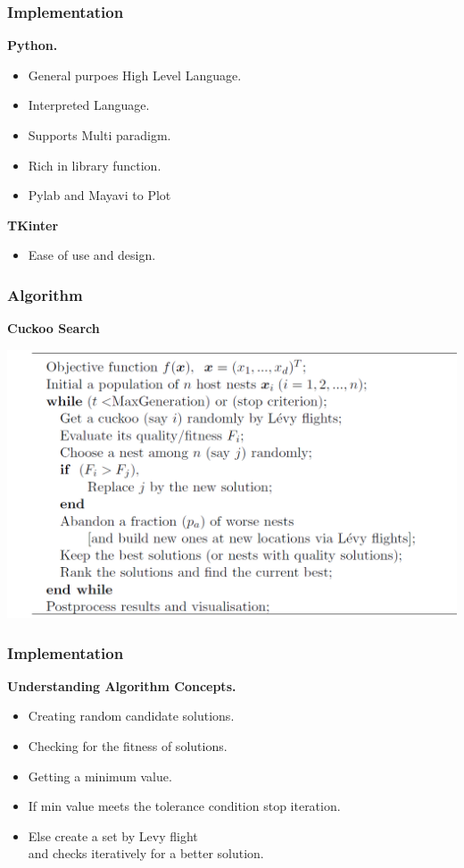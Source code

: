 \documentclass[10pt]{beamer}
\begin{document}
\begin{frame}
  \frametitle{Implementation}
  \textbf{Python.}
  \begin{itemize}
  	\item General purpoes High Level Language.
    \item Interpreted Language.
    \item Supports Multi paradigm.
    \item Rich in library function.
    \item Pylab and Mayavi to Plot 
   \end{itemize}
   \textbf{TKinter}
   \begin{itemize}
   	\item Ease of use and design.
  \end{itemize}
\end{frame}



\begin{frame}
	\frametitle{Algorithm}
	\textbf{Cuckoo Search}
	\begin{center}
	\includegraphics[width=1.0\textwidth]{ab.png}
	\end{center}
\end{frame}

\begin{frame}
  \frametitle{Implementation}
  \textbf{Understanding Algorithm Concepts.}
  \begin{itemize}
    \item Creating random candidate solutions.
    \item Checking for the fitness of solutions.
    \item Getting a minimum value.
    \item If min value meets the tolerance condition stop iteration.
    \item Else create a set by Levy flight \\ and checks iteratively for a better solution.
  \end{itemize}
\end{frame}
\end{document}
